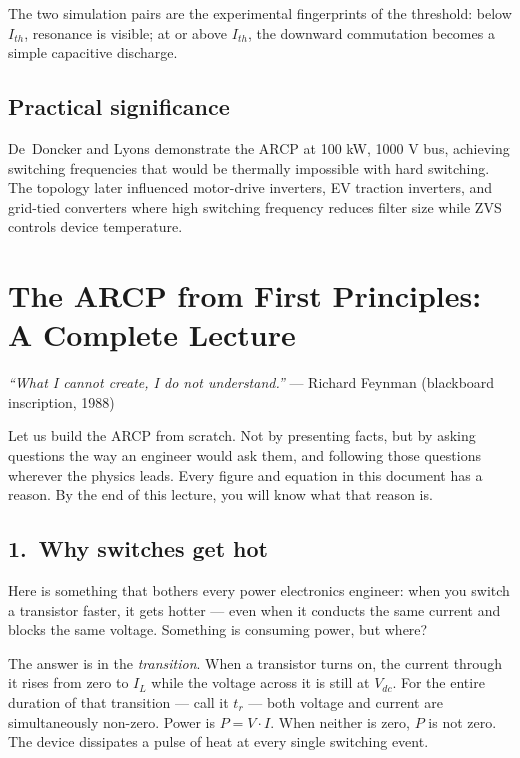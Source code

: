 \documentclass[12pt, a4paper]{article}
\def\,{ }%
\newcommand{\Vdc}{V_{dc}}
\newcommand{\IL}{I_L}
\newcommand{\Ith}{I_{th}}
\begin{document}
The two simulation pairs are the experimental fingerprints of the threshold:
below $\Ith$, resonance is visible; at or above $\Ith$, the downward
commutation becomes a simple capacitive discharge.

\subsection*{Practical significance}

De~Doncker and Lyons demonstrate the ARCP at 100\,kW, 1000\,V bus,
achieving switching frequencies that would be thermally impossible with
hard switching.
The topology later influenced motor-drive inverters, EV traction inverters,
and grid-tied converters where high switching frequency reduces filter size
while ZVS controls device temperature.

\section{The ARCP from First Principles: A Complete Lecture}
\label{sec:feynman_lecture}

\noindent\textit{``What I cannot create, I do not understand.''}
\hfill --- Richard Feynman (blackboard inscription, 1988)

\bigskip\noindent
Let us build the ARCP from scratch.
Not by presenting facts, but by asking questions the way an engineer would
ask them, and following those questions wherever the physics leads.
Every figure and equation in this document has a reason.
By the end of this lecture, you will know what that reason is.

\subsection*{1.\ Why switches get hot}

Here is something that bothers every power electronics engineer:
when you switch a transistor faster, it gets hotter --- even when it conducts
the same current and blocks the same voltage.
Something is consuming power, but where?

The answer is in the \emph{transition}.
When a transistor turns on, the current through it rises from zero to $\IL$
while the voltage across it is still at $\Vdc$.
For the entire duration of that transition --- call it $t_r$ --- both voltage
and current are simultaneously non-zero.
Power is $P = V \cdot I$.
When neither is zero, $P$ is not zero.
The device dissipates a pulse of heat at every single switching event.
\end{document}
